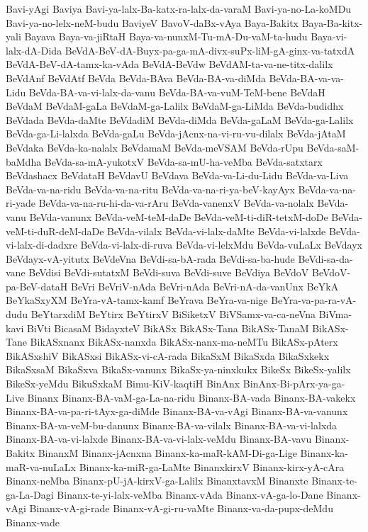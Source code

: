{Bavi-yAgi
Baviya
Bavi-ya-lalx-Ba-katx-ra-lalx-da-varaM
Bavi-ya-no-La-koMDu
Bavi-ya-no-lelx-neM-budu
BaviyeV
BavoV-daBx-vAya
Baya-Bakitx
Baya-Ba-kitx-yali
Bayava
Baya-va-jiRtaH
Baya-va-nunxM-Tu-mA-Du-vaM-ta-hudu
Baya-vi-lalx-dA-Dida
BeVdA-BeV-dA-Buyx-pa-ga-mA-divx-suPx-liM-gA-ginx-va-tatxdA
BeVdA-BeV-dA-tamx-ka-vAda
BeVdA-BeVdw
BeVdAM-ta-va-ne-titx-dalilx
BeVdAnf
BeVdAtf
BeVda
BeVda-BAva
BeVda-BA-va-diMda
BeVda-BA-va-va-Lidu
BeVda-BA-va-vi-lalx-da-vanu
BeVda-BA-va-vuM-TeM-bene
BeVdaH
BeVdaM
BeVdaM-gaLa
BeVdaM-ga-Lalilx
BeVdaM-ga-LiMda
BeVda-budidhx
BeVdada
BeVda-daMte
BeVdadiM
BeVda-diMda
BeVda-gaLaM
BeVda-ga-Lalilx
BeVda-ga-Li-lalxda
BeVda-gaLu
BeVda-jAcnx-na-vi-ru-vu-dilalx
BeVda-jAtaM
BeVdaka
BeVda-ka-nalalx
BeVdamaM
BeVda-meVSAM
BeVda-rUpu
BeVda-saM-baMdha
BeVda-sa-mA-yukotxV
BeVda-sa-mU-ha-veMba
BeVda-satxtarx
BeVdashacx
BeVdataH
BeVdavU
BeVdava
BeVda-va-Li-du-Lidu
BeVda-va-Liva
BeVda-va-na-ridu
BeVda-va-na-ritu
BeVda-va-na-ri-ya-beV-kayAyx
BeVda-va-na-ri-yade
BeVda-va-na-ru-hi-da-va-rAru
BeVda-vanenxV
BeVda-va-nolalx
BeVda-vanu
BeVda-vanunx
BeVda-veM-teM-daDe
BeVda-veM-ti-diR-tetxM-doDe
BeVda-veM-ti-duR-deM-daDe
BeVda-vilalx
BeVda-vi-lalx-daMte
BeVda-vi-lalxde
BeVda-vi-lalx-di-dadxre
BeVda-vi-lalx-di-ruva
BeVda-vi-lelxMdu
BeVda-vuLaLx
BeVdayx
BeVdayx-vA-yitutx
BeVdeVna
BeVdi-sa-bA-rada
BeVdi-sa-ba-hude
BeVdi-sa-da-vane
BeVdisi
BeVdi-sutatxM
BeVdi-suva
BeVdi-suve
BeVdiya
BeVdoV
BeVdoV-pa-BeV-dataH
BeVri
BeVriV-nAda
BeVri-nAda
BeVri-nA-da-vanUnx
BeYkA
BeYkaSxyXM
BeYra-vA-tamx-kamf
BeYrava
BeYra-va-nige
BeYra-va-pa-ra-vA-dudu
BeYtarxdiM
BeYtirx
BeYtirxV
BiSiketxV
BiVSamx-va-ca-neVna
BiVma-kavi
BiVti
BicasaM
BidayxteV
BikASx
BikASx-Tana
BikASx-TanaM
BikASx-Tane
BikASxnanx
BikASx-nanxda
BikASx-nanx-ma-neMTu
BikASx-pAterx
BikASxshiV
BikASxsi
BikASx-vi-cA-rada
BikaSxM
BikaSxda
BikaSxkekx
BikaSxsaM
BikaSxva
BikaSx-vanunx
BikaSx-ya-ninxkukx
BikeSx
BikeSx-yalilx
BikeSx-yeMdu
BikuSxkaM
Bimu-KiV-kaqtiH
BinAnx
BinAnx-Bi-pArx-ya-ga-Live
Binanx
Binanx-BA-vaM-ga-La-na-ridu
Binanx-BA-vada
Binanx-BA-vakekx
Binanx-BA-va-pa-ri-tAyx-ga-diMde
Binanx-BA-va-vAgi
Binanx-BA-va-vanunx
Binanx-BA-va-veM-bu-danunx
Binanx-BA-va-vilalx
Binanx-BA-va-vi-lalxda
Binanx-BA-va-vi-lalxde
Binanx-BA-va-vi-lalx-veMdu
Binanx-BA-vavu
Binanx-Bakitx
BinanxM
Binanx-jAcnxna
Binanx-ka-maR-kAM-Di-ga-Lige
Binanx-ka-maR-va-nuLaLx
Binanx-ka-miR-ga-LaMte
BinanxkirxV
Binanx-kirx-yA-cAra
Binanx-neMba
Binanx-pU-jA-kirxV-ga-Lalilx
BinanxtavxM
Binanxte
Binanx-te-ga-La-Dagi
Binanx-te-yi-lalx-veMba
Binanx-vAda
Binanx-vA-ga-lo-Dane
Binanx-vAgi
Binanx-vA-gi-rade
Binanx-vA-gi-ru-vaMte
Binanx-va-da-pupx-deMdu
Binanx-vade
}
